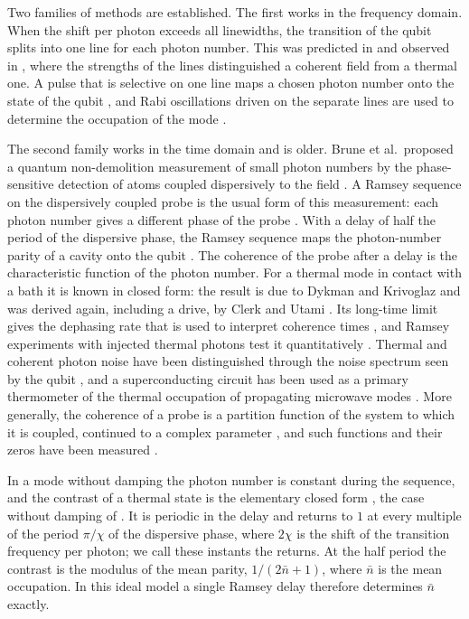 \documentclass[11pt,reqno]{amsart}
\makeatletter
\let\CG@origeqref\eqref
\newcommand{\CG@gettip}[1]{\@ifundefined{CGTip@#1}{Reference: #1}{\csname CGTip@#1\endcsname}}
\DeclareRobustCommand{\CGeqref}[1]{\pdftooltip{\CG@origeqref{#1}}{\CG@gettip{#1}}}
\let\CG@origcite\cite
\renewcommand*{\cite}[2][]{\def\CG@citekey{#2}%
  \ifx\relax#1\relax\CG@origcite{#2}\else\CG@origcite[#1]{#2}\fi}
\numberwithin{equation}{section}
\theoremstyle{plain}
\theoremstyle{definition}
\theoremstyle{remark}
\makeatother
\begin{document}
Two families of methods are established. The first works in the frequency domain. When the shift per photon exceeds all linewidths, the transition of the qubit splits into one line for each photon number. This was predicted in \cite{Gambetta2006} and observed in \cite{Schuster2007}, where the strengths of the lines distinguished a coherent field from a thermal one. A pulse that is selective on one line maps a chosen photon number onto the state of the qubit \cite{Johnson2010}, and Rabi oscillations driven on the separate lines are used to determine the occupation of the mode \cite{Sears2012}.

The second family works in the time domain and is older. Brune et al.\ proposed a quantum non-demolition measurement of small photon numbers by the phase-sensitive detection of atoms coupled dispersively to the field \cite{Brune1990}. A Ramsey sequence on the dispersively coupled probe is the usual form of this measurement: each photon number gives a different phase of the probe \cite{Johnson2010}. With a delay of half the period of the dispersive phase, the Ramsey sequence maps the photon-number parity of a cavity onto the qubit \cite{Sun2014}. The coherence of the probe after a delay is the characteristic function of the photon number. For a thermal mode in contact with a bath it is known in closed form: the result is due to Dykman and Krivoglaz \cite{DykmanKrivoglaz1987} and was derived again, including a drive, by Clerk and Utami \cite{ClerkUtami2007}. Its long-time limit gives the dephasing rate that is used to interpret coherence times \cite{Rigetti2012}, and Ramsey experiments with injected thermal photons test it quantitatively \cite{Sears2012}. Thermal and coherent photon noise have been distinguished through the noise spectrum seen by the qubit \cite{Yan2018}, and a superconducting circuit has been used as a primary thermometer of the thermal occupation of propagating microwave modes \cite{Scigliuzzo2020}. More generally, the coherence of a probe is a partition function of the system to which it is coupled, continued to a complex parameter \cite{WeiLiu2012}, and such functions and their zeros have been measured \cite{Peng2015}.

In a mode without damping the photon number is constant during the sequence, and the contrast of a thermal state is the elementary closed form \CGeqref{eq:V}, the case without damping of \cite{DykmanKrivoglaz1987,ClerkUtami2007}. It is periodic in the delay and returns to $1$ at every multiple of the period $\pi/\chi$ of the dispersive phase, where $2\chi$ is the shift of the transition frequency per photon; we call these instants the returns. At the half period the contrast is the modulus of the mean parity, $1/(2\bar n+1)$, where $\bar n$ is the mean occupation. In this ideal model a single Ramsey delay therefore determines $\bar n$ exactly.
\end{document}
